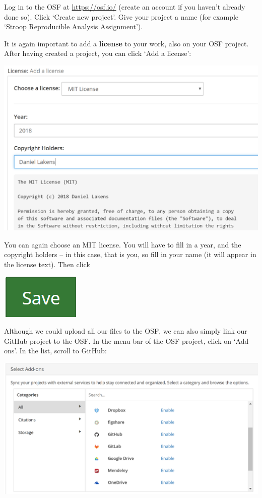 \documentclass[
  oneside]{book}
\begin{document}
Log in to the OSF at \url{https://osf.io/} (create an account if you haven't already done so). Click `Create new project'. Give your project a name (for example `Stroop Reproducible Analysis Assignment').

It is again important to add a \textbf{license} to your work, also on your OSF project. After having created a project, you can click `Add a license':

\begin{center}\includegraphics[width=1\linewidth]{images/372c6ba890617ecf396d540bed85698c} \end{center}

You can again choose an MIT license. You will have to fill in a year, and the copyright holders -- in this case, that is you, so fill in your name (it will appear in the license text). Then click

\begin{center}\includegraphics[width=0.2\linewidth]{images/e137b9bdf5f301150dc3c06b6f3eb5ca} \end{center}

Although we could upload all our files to the OSF, we can also simply link our
GitHub project to the OSF. In the menu bar of the OSF project, click on
`Add-ons'. In the list, scroll to GitHub:

\begin{center}\includegraphics[width=1\linewidth]{images/e25382896d7b290ad6649a6f2d5c13a2} \end{center}
\end{document}
